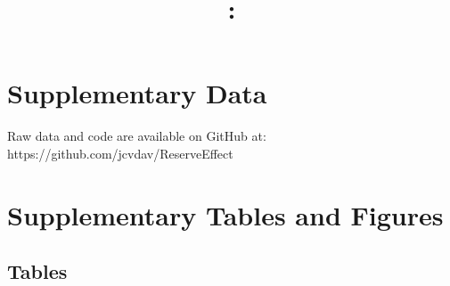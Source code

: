 \documentclass[utf8]{frontiers_suppmat} %
\theoremstyle{definition}
\theoremstyle{definition}
\theoremstyle{definition}
\theoremstyle{remark}
\begin{document}
\onecolumn
{}

\title[Supplementary Material]{{}:
\\ } %


\maketitle


\section{Supplementary Data}

Raw data and code are available on GitHub at: https://github.com/jcvdav/ReserveEffect

\section{Supplementary Tables and Figures}

\subsection{Tables}

\end{document}
